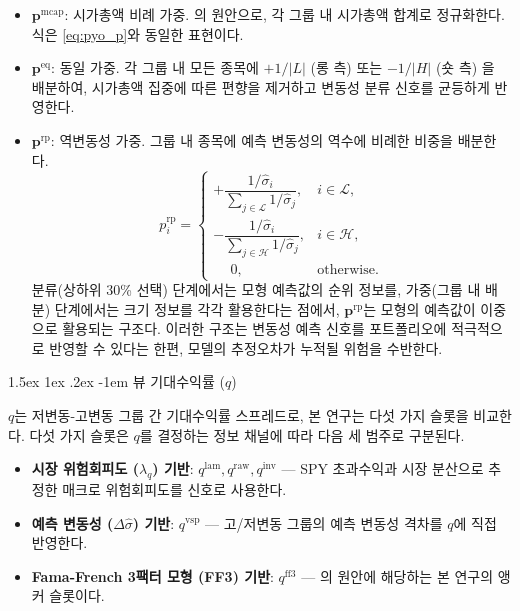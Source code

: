 \documentclass[eng]{kjas3}
\makeatletter
\newcommand\paragraph{\@startsection{paragraph}{4}{\z@}%
    {1.5ex \@plus1ex \@minus.2ex}%
    {-1em}%
    {\normalfont\normalsize\bfseries}}
\makeatother
\begin{document}
\begin{itemize}
  \item $\mathbf{p}^{\mathrm{mcap}}$: 시가총액 비례 가중. \citet{pyo2018}의 원안으로, 각 그룹 내 시가총액 합계로 정규화한다. 식은 \eqref{eq:pyo_p}와 동일한 표현이다.

  \item $\mathbf{p}^{\mathrm{eq}}$: 동일 가중. 각 그룹 내 모든 종목에 $+1/|L|$ (롱 측) 또는 $-1/|H|$ (숏 측) 을 배분하여, 시가총액 집중에 따른 편향을 제거하고 변동성 분류 신호를 균등하게 반영한다.

  \item $\mathbf{p}^{\mathrm{rp}}$: 역변동성 가중. 그룹 내 종목에 예측 변동성의 역수에 비례한 비중을 배분한다.
    \begin{equation}
      p_i^{\mathrm{rp}} =
      \begin{cases}
        +\dfrac{1/\hat{\sigma}_i}{\sum_{j \in \mathcal{L}} 1/\hat{\sigma}_j}, & i \in \mathcal{L}, \\[8pt]
        -\dfrac{1/\hat{\sigma}_i}{\sum_{j \in \mathcal{H}} 1/\hat{\sigma}_j}, & i \in \mathcal{H}, \\[6pt]
        \phantom{+}0, & \text{otherwise}.
      \end{cases}
      \label{eq:p_rp}
    \end{equation}
    분류(상하위 30\% 선택) 단계에서는 모형 예측값의 순위 정보를, 가중(그룹 내 배분) 단계에서는 크기 정보를 각각 활용한다는 점에서, $\mathbf{p}^{\mathrm{rp}}$는 모형의 예측값이 이중으로 활용되는 구조다. 이러한 구조는 변동성 예측 신호를 포트폴리오에 적극적으로 반영할 수 있다는 한편, 모델의 추정오차가 누적될 위험을 수반한다. 
\end{itemize}

\paragraph{뷰 기대수익률 ($q$)}

$q$는 저변동-고변동 그룹 간 기대수익률 스프레드로, 본 연구는 다섯 가지 슬롯을 비교한다. 다섯 가지 슬롯은 $q$를 결정하는 정보 채널에 따라 다음 세 범주로 구분된다.

\begin{itemize}
  \item \textbf{시장 위험회피도 ($\lambda_q$) 기반}: $q^{\mathrm{lam}}, q^{\mathrm{raw}}, q^{\mathrm{inv}}$ --- SPY 초과수익과 시장 분산으로 추정한 매크로 위험회피도를 신호로 사용한다.
  \item \textbf{예측 변동성 ($\Delta\hat{\sigma}$) 기반}: $q^{\mathrm{vsp}}$ --- 고/저변동 그룹의 예측 변동성 격차를 $q$에 직접 반영한다.
  \item \textbf{Fama-French 3팩터 모형 (FF3) 기반}: $q^{\mathrm{ff3}}$ --- \citet{pyo2018}의 원안에 해당하는 본 연구의 앵커 슬롯이다.
\end{itemize}
\end{document}
